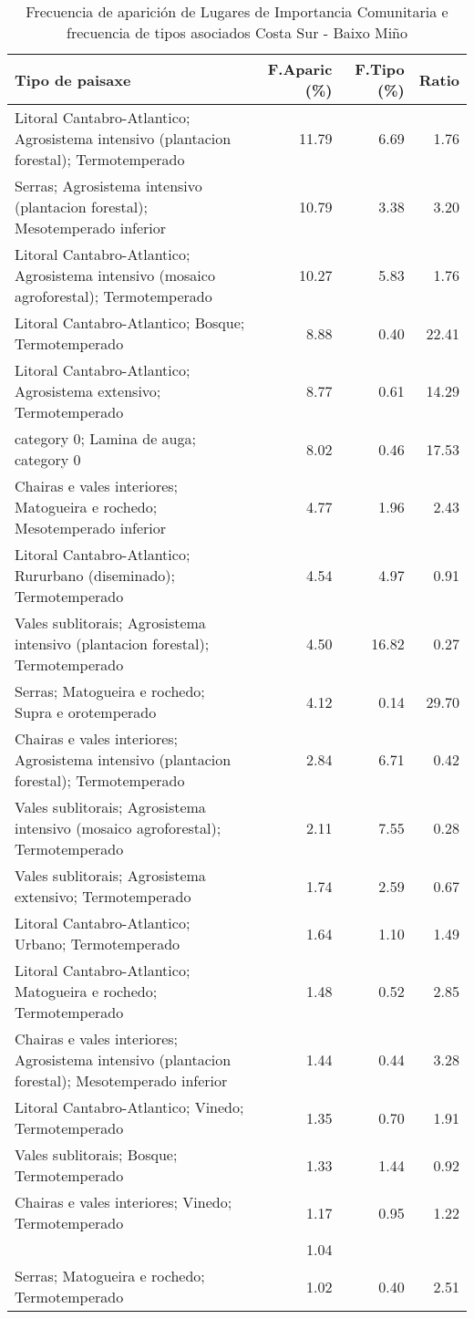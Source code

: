 \begin{table}[p]
\centering
\caption{Frecuencia de aparición de Lugares de Importancia Comunitaria e frecuencia de tipos asociados Costa Sur - Baixo Miño} 
\label{vnatura3}
\begin{tabular}{lrrr}
  \hline
Tipo de paisaxe & F.Aparic (\%) & F.Tipo (\%) & Ratio \\ 
  \hline
Litoral Cantabro-Atlantico; Agrosistema intensivo (plantacion forestal); Termotemperado & 11.79 & 6.69 & 1.76 \\ 
  Serras; Agrosistema intensivo (plantacion forestal); Mesotemperado inferior & 10.79 & 3.38 & 3.20 \\ 
  Litoral Cantabro-Atlantico; Agrosistema intensivo (mosaico agroforestal); Termotemperado & 10.27 & 5.83 & 1.76 \\ 
  Litoral Cantabro-Atlantico; Bosque; Termotemperado & 8.88 & 0.40 & 22.41 \\ 
  Litoral Cantabro-Atlantico; Agrosistema extensivo; Termotemperado & 8.77 & 0.61 & 14.29 \\ 
  category 0; Lamina de auga; category 0 & 8.02 & 0.46 & 17.53 \\ 
  Chairas e vales interiores; Matogueira e rochedo; Mesotemperado inferior & 4.77 & 1.96 & 2.43 \\ 
  Litoral Cantabro-Atlantico; Rururbano (diseminado); Termotemperado & 4.54 & 4.97 & 0.91 \\ 
  Vales sublitorais; Agrosistema intensivo (plantacion forestal); Termotemperado & 4.50 & 16.82 & 0.27 \\ 
  Serras; Matogueira e rochedo; Supra e orotemperado & 4.12 & 0.14 & 29.70 \\ 
  Chairas e vales interiores; Agrosistema intensivo (plantacion forestal); Termotemperado & 2.84 & 6.71 & 0.42 \\ 
  Vales sublitorais; Agrosistema intensivo (mosaico agroforestal); Termotemperado & 2.11 & 7.55 & 0.28 \\ 
  Vales sublitorais; Agrosistema extensivo; Termotemperado & 1.74 & 2.59 & 0.67 \\ 
  Litoral Cantabro-Atlantico; Urbano; Termotemperado & 1.64 & 1.10 & 1.49 \\ 
  Litoral Cantabro-Atlantico; Matogueira e rochedo; Termotemperado & 1.48 & 0.52 & 2.85 \\ 
  Chairas e vales interiores; Agrosistema intensivo (plantacion forestal); Mesotemperado inferior & 1.44 & 0.44 & 3.28 \\ 
  Litoral Cantabro-Atlantico; Vinedo; Termotemperado & 1.35 & 0.70 & 1.91 \\ 
  Vales sublitorais; Bosque; Termotemperado & 1.33 & 1.44 & 0.92 \\ 
  Chairas e vales interiores; Vinedo; Termotemperado & 1.17 & 0.95 & 1.22 \\ 
   & 1.04 &  &  \\ 
  Serras; Matogueira e rochedo; Termotemperado & 1.02 & 0.40 & 2.51 \\ 
   \hline
\end{tabular}
\end{table}
